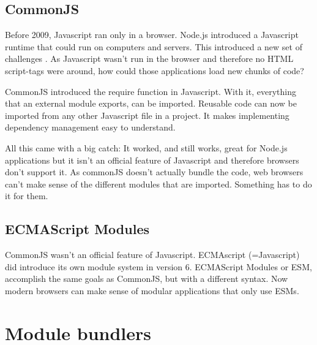 

\subsection{CommonJS}

Before 2009, Javascript ran only in a browser. Node.js introduced a Javascript runtime that could run on computers and servers. This introduced a new set of challenges \autocite{crutchfield-2018}. As Javascript wasn’t run in the browser and therefore no HTML script-tags were around, how could those applications load new chunks of code? 

CommonJS introduced the require function in Javascript. With it, everything that an external module exports, can be imported. Reusable code can now be imported from any other Javascript file in a project. It makes implementing dependency management easy to understand.

All this came with a big catch: It worked, and still works, great for Node.js applications but it isn’t an official feature of Javascript and therefore browsers don’t support it. As commonJS doesn’t actually bundle the code, web browsers can’t make sense of the different modules that are imported. Something has to do it for them. 





\subsection{ECMAScript Modules}

CommonJS wasn’t an official feature of Javascript. ECMAscript (=Javascript) did introduce its own module system in version 6. ECMAScript Modules or ESM, accomplish the same goals as CommonJS, but with a different syntax. Now modern browsers can make sense of modular applications that only use ESMs. 





\section{Module bundlers}

